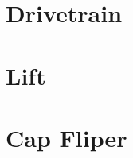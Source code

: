 \documentclass[../main.tex]{subfiles}
\begin{document}
\chapter{Drivetrain}
%

\chapter{Lift}


\chapter{Cap Fliper}

\end{document}
